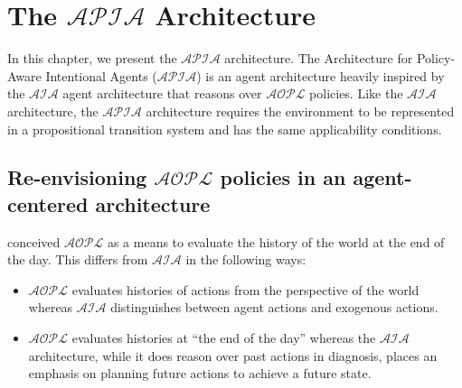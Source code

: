 \chapter{The $\mathcal{APIA}$ Architecture}


%
%
%
%
%
%

In this chapter, we present the $\mathcal{APIA}$ architecture.
The Architecture for Policy-Aware Intentional Agents ($\mathcal{APIA}$) is an agent architecture heavily inspired by the $\mathcal{AIA}$ agent architecture that reasons over $\mathcal{AOPL}$ policies.
Like the $\mathcal{AIA}$ architecture, the $\mathcal{APIA}$ architecture requires the environment to be represented in a propositional transition system and has the same applicability conditions.

\section{Re-envisioning $\mathcal{AOPL}$ policies in an agent-centered architecture}

 conceived $\mathcal{AOPL}$ as a means to evaluate the history of the world at the end of the day.
This differs from $\mathcal{AIA}$ in the following ways:

\begin{itemize}
    \item $\mathcal{AOPL}$ evaluates histories of actions from the perspective of the world whereas $\mathcal{AIA}$ distinguishes between agent actions and exogenous actions.
    \item $\mathcal{AOPL}$ evaluates histories at ``the end of the day'' whereas the $\mathcal{AIA}$ architecture, while it does reason over past actions in diagnosis, places an emphasis on planning future actions to achieve a future state.
\end{itemize}

